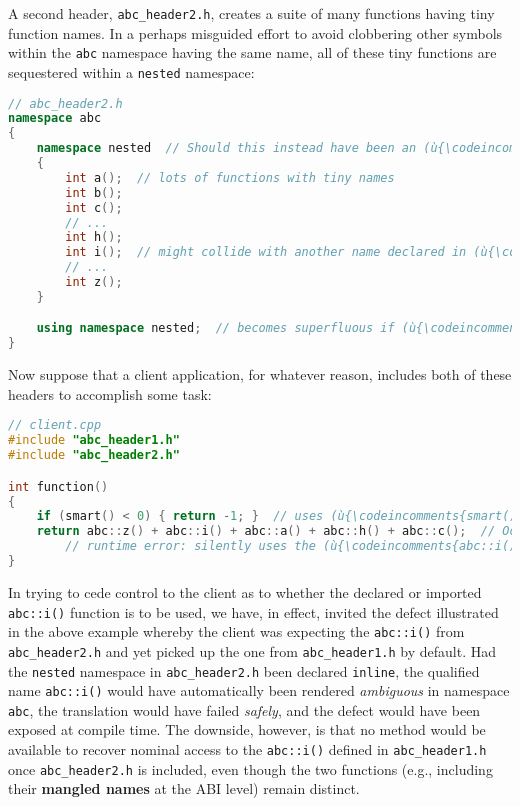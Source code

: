 \noindent A second header, \texttt{abc\_header2.h}, creates a suite of many
functions having tiny function names. In a perhaps misguided effort to
avoid clobbering other symbols within the \texttt{abc} namespace having
the same name, all of these tiny functions are sequestered within a
\texttt{nested} namespace:

\begin{lstlisting}[language=C++]
// abc_header2.h
namespace abc
{
    namespace nested  // Should this instead have been an (ù{\codeincomments{inline}}ù) namespace?
    {
        int a();  // lots of functions with tiny names
        int b();
        int c();
        // ...
        int h();
        int i();  // might collide with another name declared in (ù{\codeincomments{abc}}ù)
        // ...
        int z();
    }

    using namespace nested;  // becomes superfluous if (ù{\codeincomments{nested}}ù) is made (ù{\codeincomments{inline}}ù)
}
\end{lstlisting}
    
\noindent Now suppose that a client application, for whatever reason, includes
both of these headers to accomplish some task:

\begin{lstlisting}[language=C++]
// client.cpp
#include "abc_header1.h"
#include "abc_header2.h"

int function()
{
    if (smart() < 0) { return -1; }  // uses (ù{\codeincomments{smart()}}ù) from (ù{\codeincomments{abc\_header1.h}}ù)
    return abc::z() + abc::i() + abc::a() + abc::h() + abc::c();  // Oops!
        // runtime error: silently uses the (ù{\codeincomments{abc::i()}}ù) defined in (ù{\codeincomments{abc\_header1.h}}ù)
}
\end{lstlisting}
    
\noindent In trying to cede control to the client as to whether the declared or
imported \texttt{abc::i()} function is to be used, we have, in effect,
invited the defect illustrated in the above example whereby the client
was expecting the \texttt{abc::i()} from \texttt{abc\_header2.h} and yet
picked up the one from \texttt{abc\_header1.h} by default. Had the
\texttt{nested} namespace in \texttt{abc\_header2.h} been declared
\texttt{inline}, the qualified name \texttt{abc::i()} would have
automatically been rendered \emph{ambiguous} in namespace \texttt{abc},
the translation would have failed \emph{safely}, and the defect would
have been exposed at compile time. The downside, however, is that no
method would be available to recover nominal access to the
\texttt{abc::i()} defined in \texttt{abc\_header1.h} once
\texttt{abc\_header2.h} is included, even though the two functions
(e.g., including their \textbf{mangled names} at the ABI level) remain
distinct.

